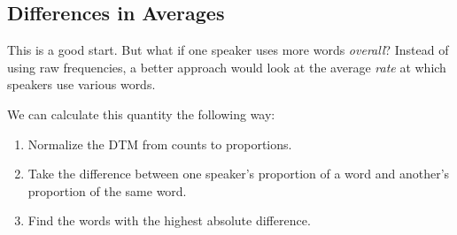 \documentclass[
]{book}
\providecommand{\tightlist}{%
  \setlength{\itemsep}{0pt}\setlength{\parskip}{0pt}}
\begin{document}
\hypertarget{differences-in-averages}{%
\subsection{Differences in Averages}\label{differences-in-averages}}

This is a good start. But what if one speaker uses more words \emph{overall}? Instead of using raw frequencies, a better approach would look at the average \emph{rate} at which speakers use various words.

We can calculate this quantity the following way:

\begin{enumerate}
\def\labelenumi{\arabic{enumi}.}
\tightlist
\item
  Normalize the DTM from counts to proportions.
\item
  Take the difference between one speaker's proportion of a word and another's proportion of the same word.
\item
  Find the words with the highest absolute difference.
\end{enumerate}
\end{document}
